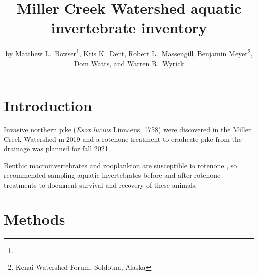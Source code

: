 \title{Miller Creek Watershed aquatic invertebrate inventory}

\author{by
 Matthew L.\ Bowser\footnote{},
 Kris K.\ Dent,
 Robert L.\ Massengill,
 Benjamin Meyer\footnote{Kenai Watershed Forum, Soldotna, Alaska},
 Dom Watts, and
 Warren R.\ Wyrick
 }

\maketitle

\section{Introduction}

Invasive northern pike (\textit{Esox lucius} Linnaeus, 1758) were discovered in the Miller Creek Watershed in 2019 \citep{KNWR2021} and a rotenone treatment to eradicate pike from the drainage was planned for fall 2021.

Benthic macroinvertebrates and zooplankton are susceptible to rotenone \citep{Finlaysonetal2018}, so \citet{Finlaysonetal2018} recommended sampling aquatic invertebrates before and after rotenone treatments to document survival and recovery of these animals.




\section{Methods}

